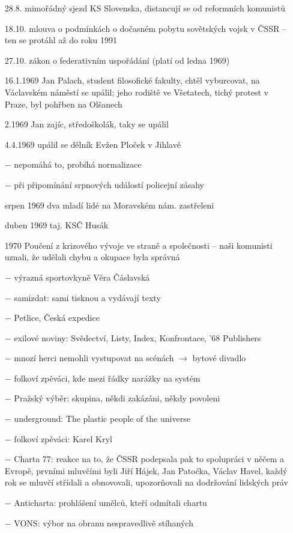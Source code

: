 \documentclass{article}
\begin{document}
\begin{itemize}
    \item[28.8.] mimořádný sjezd KS Slovenska, distancují se od reformních komunistů
    \item[18.10.] mlouva o podmínkách o dočasném pobytu sovětských vojsk v ČSSR -- ten se protáhl až do roku 1991
    \item[27.10.] zákon o federativním uspořádání (platí od ledna 1969)
    \item[16.1.1969] Jan Palach, student filosofické fakulty, chtěl vyburcovat, na Václavském náměstí se upálil; jeho rodiště ve Všetatech, tichý protest v Praze, byl pohřben na Olšanech
    \item[2.1969] Jan zajíc, středoškolák, taky se upálil
    \item[4.4.1969] upálil se dělník Evžen Ploček v Jihlavě
    \item[$-$] nepomáhá to, probíhá normalizace
    \item[$-$] při připomínání srpnových událostí policejní zásahy
    \item[srpen 1969] dva mladí lidé na Moravském nám. zastřeleni
    \item[duben 1969] taj. KSČ Husák
    \item[1970] Poučení z krizového vývoje ve straně a společnosti -- naši komunisti uznali, že udělali chybu a okupace byla správná
    \item[$-$] výrazná sportovkyně Věra Čáslavská
    \item[$-$] samizdat: sami tisknou a vydávají texty
    \item[$-$] Petlice, Česká expedice
    \item[$-$] exilové noviny: Svědectví, Listy, Index, Konfrontace, '68 Publishers
    \item[$-$] mnozí herci nemohli vystupovat na scénách $\rightarrow$ bytové divadlo
    \item[$-$] folkoví zpěváci, kde mezi řádky narážky na systém
    \item[$-$] Pražský výběr: skupina, někdi zakázáni, někdy povoleni
    \item[$-$] underground: The plastic people of the universe
    \item[$-$] folkoví zpěváci: Karel Kryl
    \item[$-$] Charta 77: reakce na to, že ČSSR podepsala pak to spolupráci v něčem a Evropě, prvními mluvčími byli Jiří Hájek, Jan Patočka, Václav Havel, každý rok se mluvčí střídali a obnovovali, upozorňovali na dodržování lidských práv
    \item[$-$] Anticharta: prohlášení umělců, kteří odmítali chartu
    \item[$-$] VONS: výbor na obranu nespravedlivě stíhaných
\end{itemize}
\end{document}

